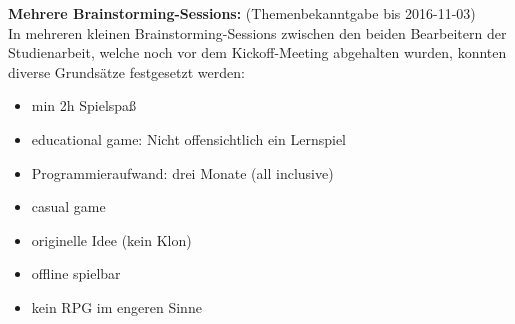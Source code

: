 \textbf{Mehrere Brainstorming-Sessions:} (Themenbekanntgabe bis 2016-11-03)\\
In mehreren kleinen Brainstorming-Sessions zwischen den beiden Bearbeitern der Studienarbeit, welche noch vor dem Kickoff-Meeting abgehalten wurden, konnten diverse Grundsätze festgesetzt werden:
\begin{itemize}
	\item min 2h Spielspaß
	\item educational game: Nicht offensichtlich ein Lernspiel
	\item Programmieraufwand: drei Monate (all inclusive)
	\item casual game
	\item originelle Idee (kein Klon)
	\item offline spielbar
	\item kein RPG im engeren Sinne
\end{itemize}

